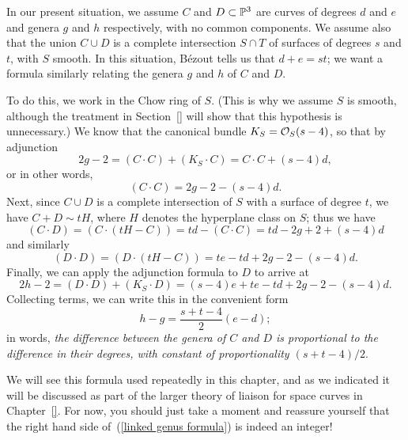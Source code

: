 In our present situation, we assume $C$ and $D \subset \PP^3$ are curves of degrees $d$ and $e$ and genera $g$ and $h$ respectively, with no common components. We assume also that the union $C \cup D$ is a complete intersection $S \cap T$ of surfaces of degrees $s$ and $t$, with $S$ smooth. In this situation, B\'ezout tells us that $d+e = st$; we want a formula similarly relating the genera $g$ and $h$ of $C$ and $D$.

To do this, we work in the Chow ring of $S$. (This is why we assume $S$ is smooth, although the treatment in Section~\ref{} will show that this hypothesis is unnecessary.) We know that the canonical bundle $K_S = \cO_S(s-4)$, so that by adjunction 
$$
2g-2 = (C\cdot C) + (K_S\cdot C) = C\cdot C + (s-4)d, 
$$
or in other words,
$$
(C \cdot C) = 2g-2 - (s-4)d.
$$
Next, since $C \cup D$ is a complete intersection of $S$ with a surface of degree $t$, we have $C + D\sim tH$, where $H$ denotes the hyperplane class on $S$; thus we have
$$
(C \cdot D) = (C \cdot (tH - C)) = td - (C \cdot C) = td - 2g + 2 + (s-4)d
$$
and similarly
$$
(D \cdot D) = (D \cdot (tH - C)) = te - td + 2g - 2 - (s-4)d.
$$
Finally, we can apply the adjunction formula to $D$ to arrive at
$$
2h - 2 = (D \cdot D) + (K_S \cdot D) = (s-4)e  + te - td + 2g - 2 - (s-4)d.
$$
Collecting terms, we can write this in the convenient form
\begin{equation}\label{linked genus formula}
h - g = \frac{s+t-4}{2}(e-d);
\end{equation}
in words, \emph{the difference between the genera of $C$ and $D$ is proportional to the difference in their degrees, with constant of proportionality $(s+t-4)/2$}. 

We will see this formula used repeatedly in this chapter, and as we indicated it will be discussed as part of the larger theory of liaison for space curves in Chapter~\ref{}. For now, you should just take a moment and reassure yourself that the right hand side of~(\ref{linked genus formula}) is indeed an integer!

